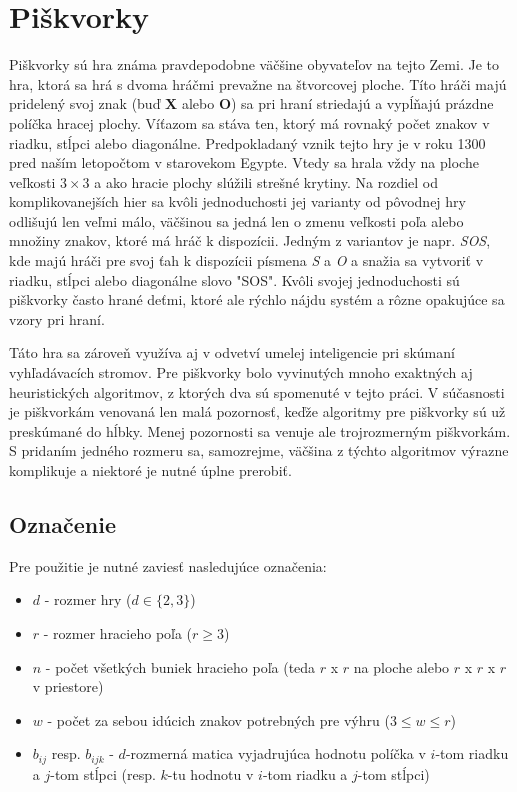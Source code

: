 \section{Piškvorky}\label{sec:tic-tac-toe}

Piškvorky sú hra známa pravdepodobne väčšine obyvateľov na tejto Zemi.
Je to hra, ktorá sa hrá s dvoma hráčmi prevažne na štvorcovej ploche.
Títo hráči majú pridelený svoj znak (buď \textbf{X} alebo \textbf{O}) sa pri hraní striedajú a vypĺňajú prázdne políčka
hracej plochy.
Víťazom sa stáva ten, ktorý má rovnaký počet znakov v riadku, stĺpci alebo diagonálne.
Predpokladaný vznik tejto hry je v roku 1300 pred naším letopočtom v starovekom Egypte.
Vtedy sa hrala vždy na ploche veľkosti $3 \times 3$ a ako hracie plochy slúžili strešné krytiny.
Na rozdiel od komplikovanejších hier sa kvôli jednoduchosti jej varianty od pôvodnej hry odlišujú len veľmi málo,
väčšinou sa jedná len o zmenu veľkosti poľa alebo množiny znakov, ktoré má hráč k dispozícii.
Jedným z variantov je napr. \emph{SOS}, kde majú hráči pre svoj ťah k dispozícii písmena \emph{S} a \emph{O} a snažia
sa vytvoriť v riadku, stĺpci alebo diagonálne slovo "SOS".
Kvôli svojej jednoduchosti sú piškvorky často hrané deťmi, ktoré ale rýchlo nájdu systém a rôzne opakujúce sa vzory
pri hraní.

Táto hra sa zároveň využíva aj v odvetví umelej inteligencie pri skúmaní vyhľadávacích stromov.
Pre piškvorky bolo vyvinutých mnoho exaktných aj heuristických algoritmov, z ktorých dva sú spomenuté v tejto práci.
V súčasnosti je piškvorkám venovaná len malá pozornosť, keďže algoritmy pre piškvorky sú už preskúmané do hĺbky.
Menej pozornosti sa venuje ale trojrozmerným piškvorkám.
S pridaním jedného rozmeru sa, samozrejme, väčšina z týchto algoritmov výrazne komplikuje a niektoré je nutné úplne
prerobiť.



\subsection{Označenie}\label{subsec:label}

Pre použitie je nutné zaviesť nasledujúce označenia:
\begin{itemize}
    \item $d$ - rozmer hry ($d \in \{2,3\}$)
    \item $r$ - rozmer hracieho poľa ($r \geq 3$)
    \item $n$ - počet všetkých buniek hracieho poľa (teda $r$ x $r$ na ploche alebo $r$ x $r$ x $r$ v priestore)
    \item $w$ - počet za sebou idúcich znakov potrebných pre výhru ($3 \leq w \leq r$)
    \item $b_{ij}$ resp. $b_{ijk}$ - $d$-rozmerná matica vyjadrujúca hodnotu políčka v $i$-tom riadku a $j$-tom
    stĺpci (resp. $k$-tu hodnotu v $i$-tom riadku a $j$-tom stĺpci)
\end{itemize}

